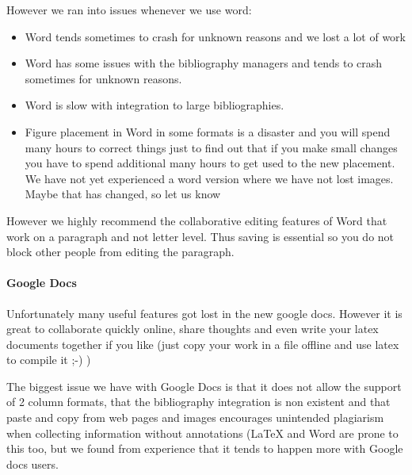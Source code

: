 However we ran into issues whenever we use word:
\begin{itemize}
\item {} 
Word tends sometimes to crash for unknown reasons and we lost a lot
of work

\item {} 
Word has some issues with the bibliography managers and tends to
crash sometimes for unknown reasons.

\item {} 
Word is slow with integration to large bibliographies.

\item {} 
Figure placement in Word in some formats is a disaster and you will
spend many hours to correct things just to find out that if you make
small changes you have to spend additional many hours to get used
to the new placement. We have not yet experienced a word version
where we have not lost images. Maybe that has changed, so let us
know

\end{itemize}

However we highly recommend the collaborative editing features of Word
that work on a paragraph and not letter level. Thus saving is
essential so you do not block other people from editing the paragraph.


\paragraph{Google Docs}
\label{\detokenize{lesson/doc/latex:google-docs}}
Unfortunately many useful features got lost in the new google
docs. However it is great to collaborate quickly online, share
thoughts and even write your latex documents together if you like
(just copy your work in a file offline and use latex to compile it ;-)
)

The biggest issue we have with Google Docs is that it does not allow
the support of 2 column formats, that the bibliography integration is
non existent and that paste and copy from web pages and images
encourages unintended plagiarism when collecting information without
annotations (LaTeX and Word are prone to this too, but we found from
experience that it tends to happen more with Google docs users.


